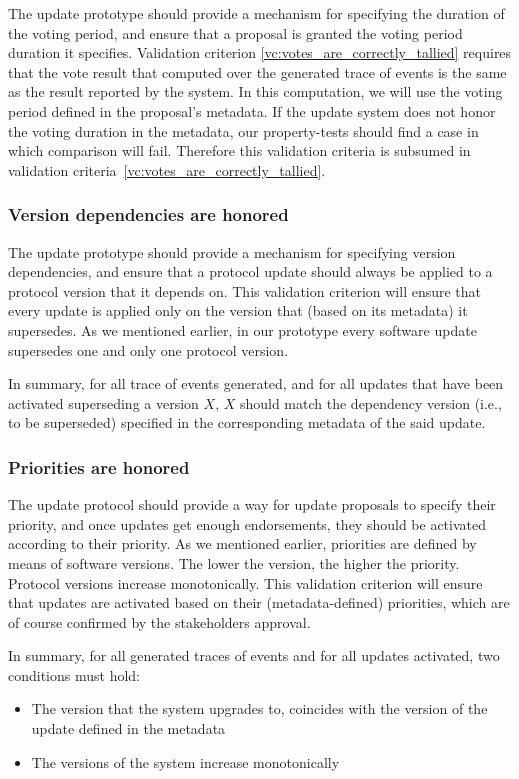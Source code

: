 The update prototype should provide a mechanism for specifying the duration of
the voting period, and ensure that a proposal is granted the voting period
duration it specifies. Validation criterion
\ref{vc:votes_are_correctly_tallied} requires that the vote result that
computed over the generated trace of events is the same as the result reported
by the system. In this computation, we will use the voting period defined in
the proposal's metadata. If the update system does not honor the voting
duration in the metadata, our property-tests should find a case in which
comparison will fail. Therefore this validation criteria is subsumed in
validation criteria~\ref{vc:votes_are_correctly_tallied}.

\subsubsection{Version dependencies are honored}
\label{vc:Version_dependencies_are_honored}
The update prototype should provide a mechanism for specifying version
dependencies, and ensure that a protocol update should always be applied to a
protocol version that it depends on. This validation criterion will ensure that
every update is applied only on the version that (based on its metadata) it
supersedes. As we mentioned earlier, in our prototype every software update
supersedes one and only one protocol version.

In summary, for all trace of events generated, and for all
updates that have been activated superseding a version $X$, $X$ should match
the dependency version (i.e., to be superseded) specified in the corresponding
metadata of the said update.

\subsubsection{Priorities are honored}\label{vc:Priorities_are_honored}
The update protocol should provide a way for update proposals to specify their
priority, and once updates get enough endorsements, they should be activated
according to their priority. As we mentioned earlier, priorities are defined by
means of software versions. The lower the version, the higher the priority.
Protocol versions increase monotonically. This validation criterion will ensure
that updates are activated based on their (metadata-defined) priorities, which
are of course confirmed by the stakeholders approval.

In summary, for all generated traces of events and for all
updates activated, two conditions must hold:
\begin{itemize}
	\item The version that the system upgrades to, coincides with the version
	of the update defined in the metadata
	\item The versions of the system increase monotonically
\end{itemize}

